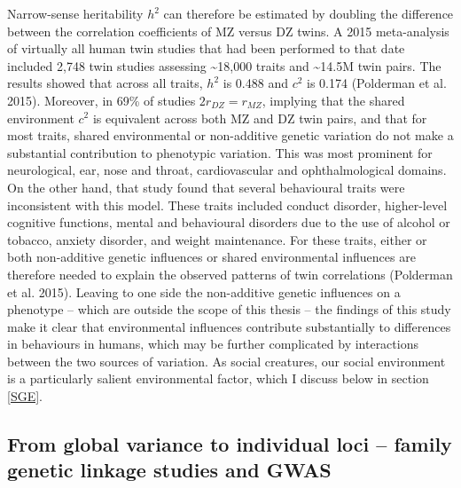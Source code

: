 \documentclass[
]{book}
\begin{document}
Narrow-sense heritability \(h^2\) can therefore be estimated by doubling the difference between the correlation coefficients of MZ versus DZ twins. A 2015 meta-analysis of virtually all human twin studies that had been performed to that date included 2,748 twin studies assessing \textasciitilde18,000 traits and \textasciitilde14.5M twin pairs. The results showed that across all traits, \(h^2\) is 0.488 and \(c^2\) is 0.174 (Polderman et al. 2015). Moreover, in 69\% of studies \(2r_{DZ} = r_{MZ}\), implying that the shared environment \(c^2\) is equivalent across both MZ and DZ twin pairs, and that for most traits, shared environmental or non-additive genetic variation do not make a substantial contribution to phenotypic variation. This was most prominent for neurological, ear, nose and throat, cardiovascular and ophthalmological domains. On the other hand, that study found that several behavioural traits were inconsistent with this model. These traits included conduct disorder, higher-level cognitive functions, mental and behavioural disorders due to the use of alcohol or tobacco, anxiety disorder, and weight maintenance. For these traits, either or both non-additive genetic influences or shared environmental influences are therefore needed to explain the observed patterns of twin correlations (Polderman et al. 2015). Leaving to one side the non-additive genetic influences on a phenotype -- which are outside the scope of this thesis -- the findings of this study make it clear that environmental influences contribute substantially to differences in behaviours in humans, which may be further complicated by interactions between the two sources of variation. As social creatures, our social environment is a particularly salient environmental factor, which I discuss below in section \ref{SGE}.

\hypertarget{GWAS}{%
\subsection{From global variance to individual loci -- family genetic linkage studies and GWAS}\label{GWAS}}
\end{document}
